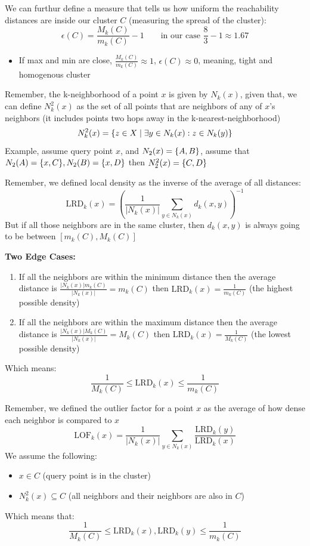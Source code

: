 \documentclass{article}
\begin{document}
We can furthur define a measure that tells us how uniform the reachability distances are inside our cluster $C$ (measuring the spread of the cluster):
\[
\epsilon(C) = \frac{M_k(C)}{m_k(C)} - 1 \qquad \text{in our case }\frac{8}{3} - 1 \approx 1.67
\]
\begin{itemize}
    \item If max and min are close, $\frac{M_k(C)}{m_k(C)} \approx 1$, $\epsilon(C) \approx 0$, meaning, tight and homogenous cluster
\end{itemize}

Remember, the k-neighborhood of a point $x$ is given by $N_k(x)$, given that, we can define $N_k^2(x)$ as the set of all points that are neighbors of any of $x$’s neighbors (it includes points two hops away in the k-nearest-neighborhood)
\[
N_k^2(x) = \{z \in X \mid \exists y \in N_k(x): z \in N_k(y)\}
\]
Example, assume query point $x$, and $N_2(x) = \{A,B\}$, assume that $N_2(A) = \{x,C\}, N_2(B)=\{x,D\}$ then $N_2^2(x) = \{C,D\}$
 

Remember, we defined local density as the inverse of the average of all distances:
\[
\text{LRD}_k(x) = \left( \frac{1}{|N_k(x)|} \sum_{y \in N_k(x)} d_k(x,y) \right)^{-1}
\]
But if all those neighbors are in the same cluster, then $d_k(x,y)$ is always going to be between $[m_k(C), M_k(C)]$

\textbf{Two Edge Cases:}
\begin{enumerate}
    \item If all the neighbors are within the minimum distance then the average distance is $\frac{|N_k(x)| m_k(C)}{|N_k(x)|} = m_k(C)$ then $\text{LRD}_k(x) = \frac{1}{m_k(C)}$ (the highest possible density)
    \item If all the neighbors are within the maximum distance then the average distance is $\frac{|N_k(x)| M_k(C)}{|N_k(x)|} = M_k(C)$ then $\text{LRD}_k(x) = \frac{1}{M_k(C)}$ (the lowest possible density)
\end{enumerate}
Which means:
\[
 \frac{1}{M_k(C)} \leq \text{LRD}_k(x) \leq  \frac{1}{m_k(C)}
\]

Remember, we defined the outlier factor for a point $x$ as the average of how dense each neighbor is compared to $x$
\[
\text{LOF}_k(x) = \frac{1}{|N_k(x)|} \sum_{y \in N_k(x)} \frac{\text{LRD}_k(y)}{\text{LRD}_k(x)}
\]
We assume the following:
\begin{itemize}
    \item $x \in C$ (query point is in the cluster)
    \item $N_k^2(x) \subseteq C$ (all neighbors and their neighbors are also in $C$)
\end{itemize}
Which means that:
\[
 \frac{1}{M_k(C)} \leq \text{LRD}_k(x),\text{LRD}_k(y)  \leq  \frac{1}{m_k(C)}
\]
\end{document}
